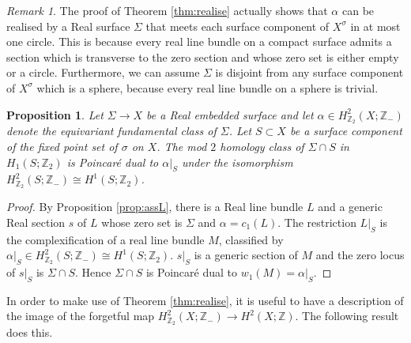 \documentclass{amsart}
\newtheorem{proposition}[theorem]{Proposition}
\theoremstyle{definition}
\theoremstyle{remark}
\newtheorem{remark}[theorem]{Remark}
\numberwithin{equation}{section}
\begin{document}
\begin{remark}
The proof of Theorem \ref{thm:realise} actually shows that $\alpha$ can be realised by a Real surface $\Sigma$ that meets each surface component of $X^\sigma$ in at most one circle. This is because every real line bundle on a compact surface admits a section which is transverse to the zero section and whose zero set is either empty or a circle. Furthermore, we can assume $\Sigma$ is disjoint from any surface component of $X^\sigma$ which is a sphere, because every real line bundle on a sphere is trivial.
\end{remark}

\begin{proposition}
Let $\Sigma \to X$ be a Real embedded surface and let $\alpha \in H^2_{\mathbb{Z}_2}(X ; \mathbb{Z}_-)$ denote the equivariant fundamental class of $\Sigma$. Let $S \subset X$ be a surface component of the fixed point set of $\sigma$ on $X$. The mod $2$ homology class of $\Sigma \cap S$ in $H_1(S ; \mathbb{Z}_2)$ is Poincar\'e dual to $\alpha|_S$ under the isomorphism $H^2_{\mathbb{Z}_2}(S ; \mathbb{Z}_-) \cong H^1(S ; \mathbb{Z}_2)$.
\end{proposition}
\begin{proof}
By Proposition \ref{prop:assL}, there is a Real line bundle $L$ and a generic Real section $s$ of $L$ whose zero set is $\Sigma$ and $\alpha = c_1(L)$. The restriction $L|_S$ is the complexification of a real line bundle $M$, classified by $\alpha|_S \in H^2_{\mathbb{Z}_2}(S ; \mathbb{Z}_-) \cong H^1(S ; \mathbb{Z}_2)$. $s|_S$ is a generic section of $M$ and the zero locus of $s|_S$ is $\Sigma \cap S$. Hence $\Sigma \cap S$ is Poincar\'e dual to $w_1(M) = \alpha|_S$.
\end{proof}


In order to make use of Theorem \ref{thm:realise}, it is useful to have a description of the image of the forgetful map $H^2_{\mathbb{Z}_2}(X ; \mathbb{Z}_-) \to H^2(X ; \mathbb{Z})$. The following result does this.
\end{document}
